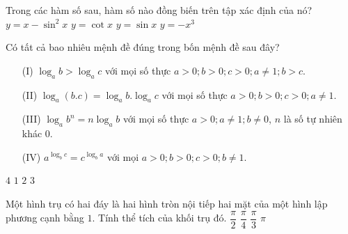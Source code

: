 \begin{ex}%
Trong các hàm số sau, hàm số nào đồng biến trên tập xác định của nó?
\choice
{\True $y=x-\sin^2x$}
{$y=\cot x$}
{$y=\sin x$}
{$y=-x^3$}
\end{ex}

\begin{ex}%
Có tất cả bao nhiêu mệnh đề đúng trong bốn mệnh đề sau đây?
\begin{itemize}
\item[(I)] $\log_ab>\log_ac$ với mọi số thực $a>0;b>0;c>0;a\ne 1;b>c$.
\item[(II)] $\log_a(b.c)=\log_ab.\log_ac$ với mọi số thực $a>0;b>0;c>0;a\ne 1$.
\item[(III)] $\log_ab^n=n\log_ab$ với mọi số thực $a>0;a\ne 1;b\ne 0$, $n$ là số tự nhiên khác $0.$
\item[(IV)] $a^{\log_bc}=c^{\log_ba}$ với mọi $a>0;b>0;c>0;b\ne 1$.
\end{itemize}
\choice
{$4$}
{\True $1$}
{$2$}
{$3$}
\end{ex}

\begin{ex}%
Một hình trụ có hai đáy là hai hình tròn nội tiếp hai mặt của một hình lập phương cạnh bằng $1.$ Tính thể tích của khối trụ đó.
\choice
{$\dfrac{\pi}{2}$}
{\True $\dfrac{\pi}{4}$}
{$\dfrac{\pi}{3}$}
{$\pi $}
\end{ex}

